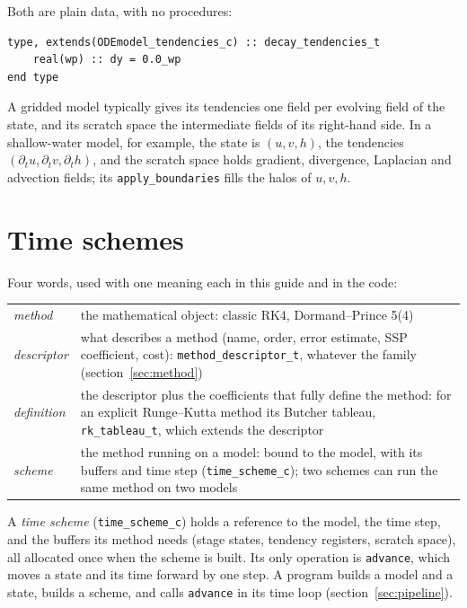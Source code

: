 \documentclass[11pt,a4paper]{article}
\newcommand{\code}[1]{\texttt{#1}}
\begin{document}
Both are plain data, with no procedures:
\begin{lstlisting}
type, extends(ODEmodel_tendencies_c) :: decay_tendencies_t
    real(wp) :: dy = 0.0_wp
end type
\end{lstlisting}
A gridded model typically gives its tendencies one field per evolving field
of the state, and its scratch space the intermediate fields of its
right-hand side. In a shallow-water model, for example, the
state is $(u, v, h)$, the tendencies
$(\partial_t u, \partial_t v, \partial_t h)$, and the scratch space holds
gradient, divergence, Laplacian and advection fields; its \code{apply\_boundaries}
fills the halos of $u, v, h$.

\section{Time schemes}
\label{sec:schemes}

Four words, used with one meaning each in this guide and in the code:
\begin{center}
\renewcommand{\arraystretch}{1.2}
\begin{tabular}{l p{11cm}}
  \toprule
  \emph{method}     & the mathematical object: classic RK4, Dormand--Prince 5(4) \\
  \emph{descriptor} & what describes a method (name, order, error estimate, SSP
                      coefficient, cost): \code{method\_descriptor\_t}, whatever the family
                      (section~\ref{sec:method}) \\
  \emph{definition} & the descriptor plus the coefficients that fully define the
                      method: for an explicit Runge--Kutta method its Butcher tableau,
                      \code{rk\_tableau\_t}, which extends the descriptor \\
  \emph{scheme}     & the method running on a model: bound to the model, with its
                      buffers and time step (\code{time\_scheme\_c}); two schemes can run
                      the same method on two models \\
  \bottomrule
\end{tabular}
\end{center}
A \emph{time scheme} (\code{time\_scheme\_c}) holds a reference to the model,
the time step, and the buffers its method needs (stage states, tendency
registers, scratch space), all allocated once when the scheme is built. Its
only operation is \code{advance}, which moves a state and its time forward by
one step. A program builds a model and a state, builds a scheme, and calls
\code{advance} in its time loop (section~\ref{sec:pipeline}).
\end{document}

